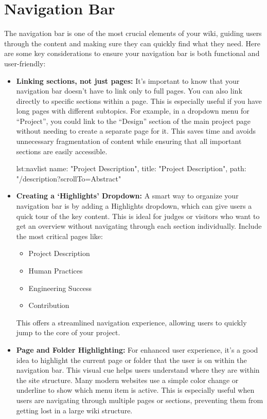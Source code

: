 \section{Navigation Bar}\label{sec:enhancing-the-navigation-bar} 
The navigation bar is one of the most crucial elements of your wiki, guiding users through the content and making sure they can quickly find what they need.
Here are some key considerations to ensure your navigation bar is both functional and user-friendly:
\begin{itemize}
    \item \textbf{Linking sections, not just pages:}
    It’s important to know that your navigation bar doesn’t have to link only to full pages.
    You can also link directly to specific sections within a page.
    This is especially useful if you have long pages with different subtopics.
    For example, in a dropdown menu for ``Project'', you could link to the ``Design'' section of the main project page without needing to create a separate page for it.
    This saves time and avoids unnecessary fragmentation of content while ensuring that all important sections are easily accessible.
    \begin{mytsbox}{lst:navlist}
    {
        name: "Project Description",
        title: "Project Description",
        path: "/description?scrollTo=Abstract"
    }
    \end{mytsbox}
    \item \textbf{Creating a ‘Highlights’ Dropdown:}
    A smart way to organize your navigation bar is by adding a Highlights dropdown, which can give users a quick tour of the key content.
    This is ideal for judges or visitors who want to get an overview without navigating through each section individually.
    Include the most critical pages like:
    \begin{itemize}
        \item Project Description
        \item Human Practices
        \item Engineering Success
        \item Contribution
    \end{itemize}
    This offers a streamlined navigation experience, allowing users to quickly jump to the core of your project.

    \item \textbf{Page and Folder Highlighting:}
    For enhanced user experience, it’s a good idea to highlight the current page or folder that the user is on within the navigation bar.
    This visual cue helps users understand where they are within the site structure.
    Many modern websites use a simple color change or underline to show which menu item is active.
    This is especially useful when users are navigating through multiple pages or sections, preventing them from getting lost in a large wiki structure.


\end{itemize}

